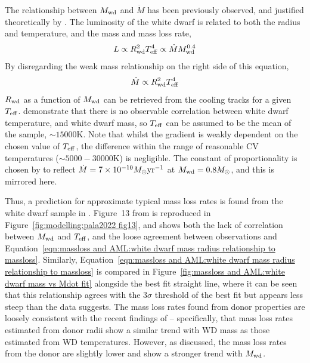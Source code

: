 The relationship between $M_{\rm wd}$ and $\dot M$ has been previously observed, and justified theoretically by \citep{Pala2021}.
The luminosity of the white dwarf is related to both the radius and temperature, and the mass and mass loss rate,
\begin{equation}
    L \propto R^2_{\rm wd} T_{\rm eff}^4 \propto \dot M M_{\rm wd}^{0.4}
\end{equation}
By disregarding the weak mass relationship on the right side of this equation,
\begin{equation}
    \label{eqn:massloss and AML:white dwarf mass radius relationship to massloss}
    \dot M \propto R_{\rm wd}^2 T_{\rm eff}^4
\end{equation}
$R_{\rm wd}$ as a function of $M_{\rm wd}$ can be retrieved from the \citep{Bergeron1995} cooling tracks for a given $T_{\rm eff}$.
\citet{Pala2021} demonstrate that there is no observable correlation between white dwarf temperature, and white dwarf mass, so $T_{\rm eff}$ can be assumed to be the mean of the \citet{Pala2021} sample, $\sim 15000$K.
Note that whilst the gradient is weakly dependent on the chosen value of $T_{\rm eff}$, the difference within the range of reasonable CV temperatures ($\sim 5000 - 30000$K) is negligible.
The constant of proportionality is chosen by \citep{Pala2021} to reflect $\dot M = 7\times 10^{-10} M_\odot {\rm yr^{-1}}$ at $M_{\rm wd} = 0.8 M_\odot$, and this is mirrored here.

Thus, a prediction for approximate typical mass loss rates is found from the white dwarf sample in \citet{Pala2021}. Figure~13 from \citep{Pala2021} is reproduced in Figure~\ref{fig:modelling:pala2022 fig13}, and shows both the lack of correlation between $M_{\rm wd}$ and $T_{\rm eff}$, and the loose agreement between observations and Equation~\ref{eqn:massloss and AML:white dwarf mass radius relationship to massloss}.
Similarly, Equation~\ref{eqn:massloss and AML:white dwarf mass radius relationship to massloss} is compared in Figure~\ref{fig:massloss and AML:white dwarf mass vs Mdot fit} alongside the best fit straight line, where it can be seen that this relationship agrees with the $3\sigma$ threshold of the best fit but appears less steep than the data suggests.
The mass loss rates found from donor properties are loosely consistent with the recent findings of \citet{Pala2021} -- specifically, that mass loss rates estimated from donor radii show a similar trend with WD mass as those estimated from WD temperatures. However, as discussed, the mass loss rates from the donor are slightly lower and show a stronger trend with $M_{\rm wd}$.

